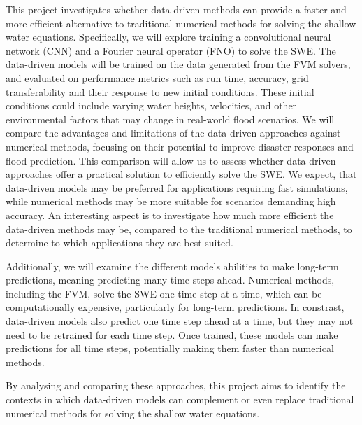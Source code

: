 This project investigates whether data-driven methods can provide a faster and more efficient alternative to traditional numerical methods for solving the shallow water equations.
Specifically, we will explore training a convolutional neural network (CNN) and a Fourier neural operator (FNO) to solve the SWE.
The data-driven models will be trained on the data generated from the FVM solvers, and evaluated on performance metrics such as run time, accuracy, grid transferability and their response to new initial conditions.
These initial conditions could include varying water heights, velocities, and other environmental factors that may change in real-world flood scenarios.
We will compare the advantages and limitations of the data-driven approaches against numerical methods, focusing on their potential to improve disaster responses and flood prediction.
This comparison will allow us to assess whether data-driven approaches offer a practical solution to efficiently solve the SWE.
We expect, that data-driven models may be preferred for applications requiring fast simulations, while numerical methods may be more suitable for scenarios demanding high accuracy.
An interesting aspect is to investigate how much more efficient the data-driven methods may be, compared to the traditional numerical methods, to determine to which applications they are best suited.

Additionally, we will examine the different models abilities to make long-term predictions, meaning predicting many time steps ahead.
Numerical methods, including the FVM, solve the SWE one time step at a time, which can be computationally expensive, particularly for long-term predictions.
In constrast, data-driven models also predict one time step ahead at a time, but they may not need to be retrained for each time step.
Once trained, these models can make predictions for all time steps, potentially making them faster than numerical methods.

By analysing and comparing these approaches, this project aims to identify the contexts in which data-driven models can complement or even replace traditional numerical methods for solving the shallow water equations.

